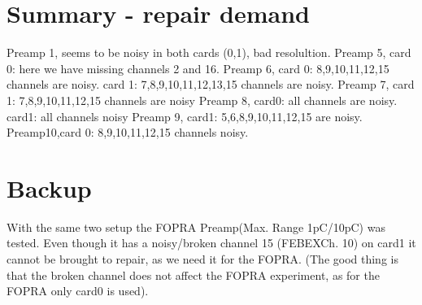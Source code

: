 \documentclass{report}
\begin{document}
\newpage
\clearpage







\section{Summary - repair demand}
Preamp 1, seems to be noisy in both cards (0,1), bad resolultion.\newline
Preamp 5, card 0: here we have missing channels 2 and 16.\newline
Preamp 6, card 0: 8,9,10,11,12,15 channels are noisy. card 1: 7,8,9,10,11,12,13,15 channels are noisy.\newline
Preamp 7, card 1: 7,8,9,10,11,12,15 channels are noisy\newline
Preamp 8, card0: all channels are noisy. card1: all channels noisy\newline
Preamp 9, card1: 5,6,8,9,10,11,12,15 are noisy.\newline
Preamp10,card 0: 8,9,10,11,12,15 channels noisy.\newline
\newpage


\section{Backup}
With the same two setup the FOPRA Preamp(Max. Range 1pC/10pC) was tested. Even though it has a noisy/broken channel 15 (FEBEXCh. 10) on card1 it cannot be brought to repair, as we need it for the FOPRA. (The good thing is that the broken channel does not affect the FOPRA experiment, as for the FOPRA only card0 is used).
\end{document}
